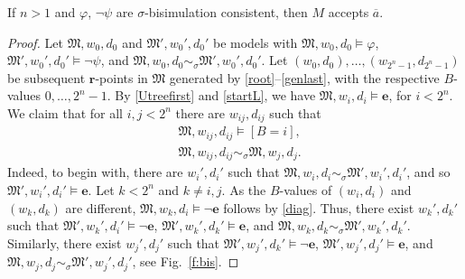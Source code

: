 \documentclass{lmcs} %
\theoremstyle{plain}\newtheorem{satz}[thm]{Satz} %
\newcommand{\diag}{\fform{e}}
\newcommand{\fform}[1]{\boldsymbol{#1}}
\newcommand{\cR}{B}
\newcommand{\cvf}[3]{[{#1}\mathop{#2}{#3}]}
\newcommand{\inpw}{\overline{a}}
\newcommand{\start}{\fform{r}}
\newcommand{\grid}{\mathsf{equ}}
\begin{document}
	\begin{lem}\label{l:lbcompl}
		If $n>1$ and $\varphi$, $\neg\psi$ are $\sigma$-bisimulation consistent, then $M$ accepts $\inpw$.
	\end{lem}
	\begin{proof}
		Let $\mathfrak M,w_0,d_0$ and $\mathfrak M',w_0',d_0'$ be models with
		$\mathfrak M,w_0,d_0\models\varphi$, $\mathfrak M',w_0',d_0'\models\neg\psi$, and 
		$\mathfrak M,w_0,d_0\sim_\sigma\mathfrak M',w_0',d_0'$.
		Let $(w_0,d_0),\dots,(w_{2^n-1},d_{2^n-1})$ be subsequent $\start$-points in $\mathfrak M$ generated by 
		\eqref{root}--\eqref{genlast}, with the respective
		$\cR$-values $0,\dots,2^n\mathop{-}1$. 
		By \eqref{Utreefirst} and \eqref{startL}, we have $\mathfrak M,w_i,d_i\models\diag$, for $i<2^n$.
		We claim that for all $i,j<2^n$ there are $w_{ij},d_{ij}$ such that
		\begin{align}
			\label{cldsq}
			& \mathfrak M,w_{ij},d_{ij}\models\cvf{\cR}{=}{i},\\
			\label{clsim}
			& \mathfrak M,w_{ij},d_{ij}\sim_\sigma \mathfrak M,w_j,d_j.
		\end{align}
		Indeed, to begin with, there are $w_i',d_i'$ such that $\mathfrak M,w_i,d_i\sim_\sigma\mathfrak M',w_i',d_i'$, and so
		$\mathfrak M',w_i',d_i'\models\diag$. Let $k<2^n$ and $k\ne i,j$.
		As the $\cR$-values of $(w_i,d_i)$ and $(w_k,d_k)$ are different, 
		$\mathfrak M,w_k,d_i\models\neg\diag$ follows by \eqref{diag}.
		Thus, there exist $w_k',d_k'$ such that 
		$\mathfrak M',w_k',d_i'\models\neg\diag$, 
		$\mathfrak M',w_k',d_k'\models\diag$, and 
		$\mathfrak M,w_k,d_k\sim_\sigma\mathfrak M',w_k',d_k'$.
		Similarly, there exist $w_j',d_j'$ such that 
		$\mathfrak M',w_j',d_k'\models\neg\diag$, 
		$\mathfrak M',w_j',d_j'\models\diag$, and 
		$\mathfrak M,w_j,d_j\sim_\sigma\mathfrak M',w_j',d_j'$, see Fig.~\ref{f:bis}.
		

\end{proof}
\end{document}
